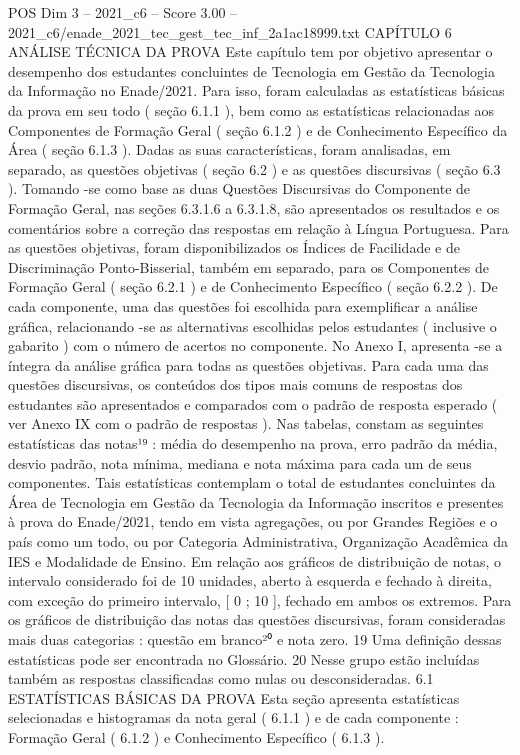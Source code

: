 \begin{textsample}{POS Dim 3 – 2021\_c6 – Score 3.00 – 2021\_c6/enade\_2021\_tec\_gest\_tec\_inf\_2a1ac18999.txt}  \label{ex:f3_pos_049}
CAPÍTULO 6 ANÁLISE TÉCNICA DA PROVA Este capítulo tem por objetivo apresentar o desempenho dos estudantes concluintes de Tecnologia em Gestão da Tecnologia da Informação no Enade/2021.
Para isso, foram calculadas as estatísticas básicas da prova em seu todo ( seção 6.1.1 ), bem como as estatísticas relacionadas aos Componentes de Formação Geral ( seção 6.1.2 ) e de Conhecimento Específico da Área ( seção 6.1.3 ).
Dadas as suas características, foram analisadas, em separado, as questões objetivas ( seção 6.2 ) e as questões discursivas ( seção 6.3 ).
Tomando -se como base as duas Questões Discursivas do Componente de Formação Geral, nas seções 6.3.1.6 a 6.3.1.8, são apresentados os resultados e os comentários sobre a correção das respostas em relação à Língua Portuguesa.
Para as questões objetivas, foram disponibilizados os Índices de Facilidade e de Discriminação Ponto-Bisserial, também em separado, para os Componentes de Formação Geral ( seção 6.2.1 ) e de Conhecimento Específico ( seção 6.2.2 ).
De cada componente, uma das questões foi escolhida para exemplificar a análise gráfica, relacionando -se as alternativas escolhidas pelos estudantes ( inclusive o gabarito ) com o número de acertos no componente.
No Anexo I, apresenta -se a íntegra da análise gráfica para todas as questões objetivas.
Para cada uma das questões discursivas, os conteúdos dos tipos mais comuns de respostas dos estudantes são apresentados e comparados com o padrão de resposta esperado ( ver Anexo IX com o padrão de respostas ).
Nas tabelas, constam as seguintes estatísticas das notas¹⁹ : média do desempenho na prova, erro padrão da média, desvio padrão, nota mínima, mediana e nota máxima para cada um de seus componentes.
Tais estatísticas contemplam o total de estudantes concluintes da Área de Tecnologia em Gestão da Tecnologia da Informação inscritos e presentes à prova do Enade/2021, tendo em vista agregações, ou por Grandes Regiões e o país como um todo, ou por Categoria Administrativa, Organização Acadêmica da IES e Modalidade de Ensino.
Em relação aos gráficos de distribuição de notas, o intervalo considerado foi de 10 unidades, aberto à esquerda e fechado à direita, com exceção do primeiro intervalo, [ 0 ; 10 ], fechado em ambos os extremos.
Para os gráficos de distribuição das notas das questões discursivas, foram consideradas mais duas categorias : questão em branco²⁰ e nota zero. 19 Uma definição dessas estatísticas pode ser encontrada no Glossário. 20 Nesse grupo estão incluídas também as respostas classificadas como nulas ou desconsideradas. 6.1 ESTATÍSTICAS BÁSICAS DA PROVA Esta seção apresenta estatísticas selecionadas e histogramas da nota geral ( 6.1.1 ) e de cada componente : Formação Geral ( 6.1.2 ) e Conhecimento Específico ( 6.1.3 ).

\end{textsample}
